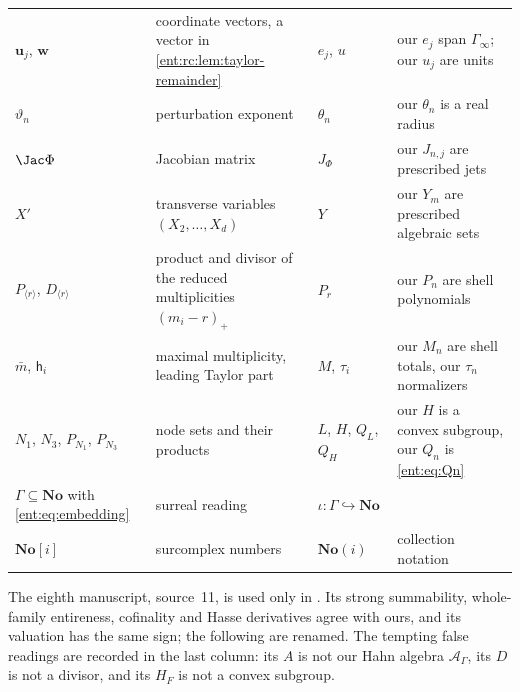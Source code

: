 \documentclass[11pt]{article}
\theoremstyle{plain}
\theoremstyle{plain}
\theoremstyle{plain}
\theoremstyle{definition}
\theoremstyle{definition}
\theoremstyle{definition}
\theoremstyle{definition}
\theoremstyle{remark}
\newcommand{\No}{\mathbf{No}}
\newcommand{\A}{\mathcal A_\Gamma}\newcommand{\OO}{\mathcal O_\Gamma}
\begin{document}
\begin{center}
\begin{tabularx}{\textwidth}{@{}P{0.2\textwidth}P{0.3\textwidth}P{0.17\textwidth}Y@{}}
$\mathbf u_j$, $\mathbf w$ & coordinate vectors, a vector in
\cref{ent:rc:lem:taylor-remainder} & $e_j$, $u$ & our $e_j$ span
$\Gamma_\infty$; our $u_j$ are units\\[0.3em]
$\vartheta_n$ & perturbation exponent & $\theta_n$ & our $\theta_n$ is a real
radius\\[0.3em]
$\Jac\Phi$ & Jacobian matrix & $J_\Phi$ & our $J_{n,j}$ are prescribed
jets\\[0.3em]
$X'$ & transverse variables $(X_2,\ldots,X_d)$ & $Y$ & our $Y_m$ are
prescribed algebraic sets\\[0.3em]
$P_{\langle r\rangle}$, $D_{\langle r\rangle}$ & product and divisor of the
reduced multiplicities $(m_i-r)_+$ & $P_r$ & our $P_n$ are shell
polynomials\\[0.3em]
$\bar m$, $\mathsf h_i$ & maximal multiplicity, leading Taylor part & $M$,
$\tau_i$ & our $M_n$ are shell totals, our $\tau_n$ normalizers\\[0.3em]
$N_1$, $N_3$, $P_{N_1}$, $P_{N_3}$ & node sets and their products & $L$,
$H$, $Q_L$, $Q_H$ & our $H$ is a convex subgroup, our $Q_n$ is
\eqref{ent:eq:Qn}\\[0.3em]
$\Gamma\subseteq\No$ with \eqref{ent:eq:embedding} & surreal reading &
$\iota:\Gamma\hookrightarrow\No$ & \\[0.3em]
$\No[i]$ & surcomplex numbers & $\No(i)$ & collection notation\\
\bottomrule
\end{tabularx}
\end{center}

The eighth manuscript, source~11, is used only in
. Its strong
summability, whole-family entireness, cofinality and Hasse derivatives agree
with ours, and its valuation has the same sign; the following are renamed.
The tempting false readings are recorded in the last column: its $A$ is not
our Hahn algebra $\A$, its $D$ is not a divisor, and its $H_F$ is not a convex
subgroup.
\end{document}
